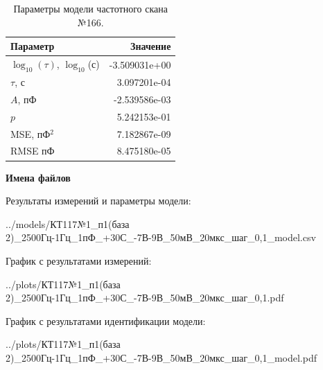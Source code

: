 \begin{table}[!ht]
    \centering
    \caption{Параметры модели частотного скана №166.}
    \begin{tabular}{|l|r|}
        \hline
        Параметр                                       & Значение                  \\ \hline
        $\log_{10}(\tau)$, $\log_{10}$(с)              & -3.509031e+00             \\ \hline
        $\tau$, с                                      & 3.097201e-04              \\ \hline
        $A$, пФ                                        & -2.539586e-03             \\ \hline
        $p$                                            & 5.242153e-01              \\ \hline
        MSE, пФ$^2$                                    & 7.182867e-09              \\ \hline
        RMSE пФ                                        & 8.475180e-05              \\ \hline
    \end{tabular}
    \label{table:frequency_scan_model_166}
\end{table}

\textbf{Имена файлов}

Результаты измерений и параметры модели:

\scriptsize../models/КТ117№1\_п1(база 2)\_2500Гц-1Гц\_1пФ\_+30С\_-7В-9В\_50мВ\_20мкс\_шаг\_0,1\_model.csv
\normalsize

График с результатами измерений:

\scriptsize../plots/КТ117№1\_п1(база 2)\_2500Гц-1Гц\_1пФ\_+30С\_-7В-9В\_50мВ\_20мкс\_шаг\_0,1.pdf
\normalsize

График с результатами идентификации модели:

\scriptsize../plots/КТ117№1\_п1(база 2)\_2500Гц-1Гц\_1пФ\_+30С\_-7В-9В\_50мВ\_20мкс\_шаг\_0,1\_model.pdf
\normalsize

